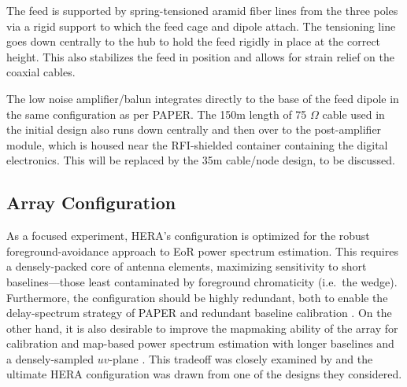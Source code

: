 \documentclass[preprint,11pt]{aastex}
\begin{document}

The feed is supported by spring-tensioned aramid fiber lines from the three poles via a rigid support to which the feed cage and dipole attach.  The tensioning line goes down centrally to the hub to hold the feed rigidly in place at the correct height.  This also stabilizes the feed in position and allows for strain relief on the coaxial cables.  

The low noise amplifier/balun integrates directly to the base of the feed dipole in the same configuration as per PAPER.  The 150m length of 75 $\Omega$ cable used in the initial design also runs down centrally and then over to the post-amplifier module, which is housed near the RFI-shielded container containing the digital electronics.  This will be replaced by the 35m cable/node design, to be discussed.


\subsection{Array Configuration}
\label{sec:arrayConfig}

As a focused experiment, HERA's configuration is optimized for the robust foreground-avoidance approach to EoR power spectrum estimation. 
This requires a densely-packed core of antenna elements, maximizing sensitivity to short baselines---those least contaminated by foreground chromaticity (i.e.\ the wedge). 
Furthermore, the configuration should be highly redundant, both to enable the delay-spectrum strategy of PAPER \citep{parsons_et_al2012a} and redundant baseline calibration \citep{liu_et_al2010,zheng_et_al2014}.
On the other hand, it is also desirable to improve the mapmaking ability of the array for calibration and map-based power spectrum estimation with longer baselines and a densely-sampled $uv$-plane \citep{dillon_et_al2015a}. This tradeoff was closely examined by \citet{dillon_parsons2016} and the ultimate HERA configuration was drawn from one of the designs they considered.
\end{document}
